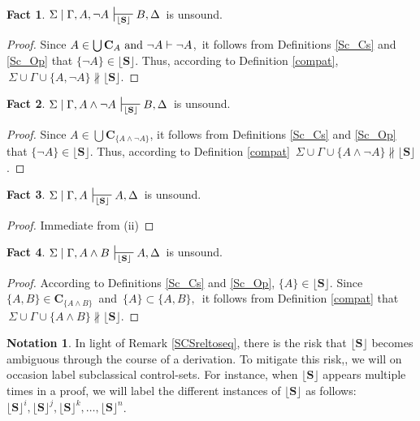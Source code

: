 \documentclass{article}                     %
\theoremstyle{theorem}
\theoremstyle{corollary}
\theoremstyle{lemma}
\theoremstyle{definition}
\theoremstyle{remark}
\theoremstyle{definition}
\theoremstyle{notation}
\newtheorem{notation}{Notation}
\theoremstyle{definition}
\theoremstyle{proposition}
\theoremstyle{definition}
\newtheorem{fact}{Fact}
\begin{document}
\vspace{1mm}

\begin{fact}
$\Sigma\mid\Gamma, A, \neg A \,\sststile{\lfloor\mathbf{S}\rfloor}{} B,\Delta\,$ is unsound.
\end{fact}
\begin{proof}
Since $A \in \bigcup\mathbf{C}_{A} \text{\,\,and\,\,} \neg A\vdash\neg A  $,\, it follows from Definitions \ref{Sc_Cs} and \ref{Sc_Op} that $ \{\neg A\} \in \mathbf{\lfloor\mathbf{S}\rfloor}  $. Thus, according to Definition \ref{compat},\, $ \,\Sigma\cup\Gamma\cup\{A,\neg A\}\nparallel\lfloor\mathbf{S}\rfloor  $.
\end{proof}

\begin{fact}
$\Sigma\mid\Gamma, A\wedge\neg A \,\sststile{\lfloor\mathbf{S}\rfloor}{} B,\Delta\,$ is unsound.
\begin{proof}
Since $ A \in \bigcup\mathbf{C}_{\{A\wedge\neg A\}}$, it follows from Definitions \ref{Sc_Cs} and \ref{Sc_Op} that $ \{\neg A\} \in \mathbf{\lfloor\mathbf{S}\rfloor}$. Thus, according to Definition \ref{compat} $ \,\Sigma\cup\Gamma\cup\{A \wedge\neg A\}\nparallel\lfloor\mathbf{S}\rfloor  $.
\end{proof}
\end{fact}

\begin{fact}
$\Sigma\mid\Gamma,A \,\sststile{\lfloor\mathbf{S}\rfloor}{} A,\Delta\,$ is unsound.
\begin{proof}
Immediate from (ii)
\end{proof}
\end{fact}

\begin{fact}
$\Sigma\mid\Gamma,A\wedge B \,\sststile{\lfloor\mathbf{S}\rfloor}{} A,\Delta\,$ is unsound.
\begin{proof}
According to Definitions \ref{Sc_Cs} and \ref{Sc_Op}, $ \{A\}\in \mathbf{\lfloor\mathbf{S}\rfloor} $. Since $ \{A,B\} \in \mathbf{C}_{\{A\wedge B\}} $ \,and\, $\{A\}\subset\{A,B\},$ \,it follows from Definition \ref{compat} that $\,\Sigma\cup\Gamma\cup\{A\wedge B\}\nparallel\lfloor\mathbf{S}\rfloor $.
\end{proof}
\end{fact}


\begin{notation}
In light of Remark \ref{SCSreltoseq}, there is the risk that $ \lfloor\mathbf{S}\rfloor $ becomes ambiguous through the course of a derivation. To mitigate this risk,, we will on occasion label subclassical control-sets. For instance, when $ \lfloor\mathbf{S}\rfloor $ appears multiple times in a proof, we will label the different instances of $ \lfloor\mathbf{S}\rfloor $ as follows: $ \lfloor\mathbf{S}\rfloor^{i},  \lfloor\mathbf{S}\rfloor^{j}, \lfloor\mathbf{S}\rfloor^{k}, \ldots, \lfloor\mathbf{S}\rfloor^{n} $.
\end{notation}
\end{document}
